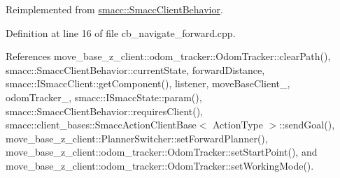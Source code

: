Reimplemented from \hyperlink{classsmacc_1_1SmaccClientBehavior_a7962382f93987c720ad432fef55b123f}{smacc\+::\+Smacc\+Client\+Behavior}.



Definition at line 16 of file cb\+\_\+navigate\+\_\+forward.\+cpp.



References move\+\_\+base\+\_\+z\+\_\+client\+::odom\+\_\+tracker\+::\+Odom\+Tracker\+::clear\+Path(), smacc\+::\+Smacc\+Client\+Behavior\+::current\+State, forward\+Distance, smacc\+::\+I\+Smacc\+Client\+::get\+Component(), listener, move\+Base\+Client\+\_\+, odom\+Tracker\+\_\+, smacc\+::\+I\+Smacc\+State\+::param(), smacc\+::\+Smacc\+Client\+Behavior\+::requires\+Client(), smacc\+::client\+\_\+bases\+::\+Smacc\+Action\+Client\+Base$<$ Action\+Type $>$\+::send\+Goal(), move\+\_\+base\+\_\+z\+\_\+client\+::\+Planner\+Switcher\+::set\+Forward\+Planner(), move\+\_\+base\+\_\+z\+\_\+client\+::odom\+\_\+tracker\+::\+Odom\+Tracker\+::set\+Start\+Point(), and move\+\_\+base\+\_\+z\+\_\+client\+::odom\+\_\+tracker\+::\+Odom\+Tracker\+::set\+Working\+Mode().


